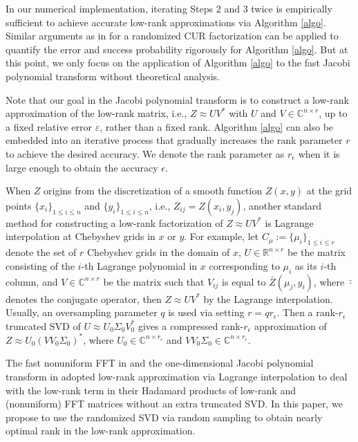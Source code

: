 \documentclass[11pt]{article}
\begin{document}
In our numerical implementation, iterating Steps $2$ and $3$ twice is empirically sufficient to achieve accurate low-rank approximations via Algorithm \ref{algo}. Similar arguments as in \cite{subCUR} for a randomized CUR factorization can be applied to quantify the error and success probability rigorously for Algorithm \ref{algo}. But at this point, we only focus on the application of Algorithm \ref{algo} to the fast Jacobi polynomial transform without theoretical analysis.



Note that our goal in the Jacobi polynomial transform is to construct a low-rank approximation of the low-rank matrix, i.e., $Z\approx U V^*$ with $U$ and $V\in\mathbb{C}^{n\times r}$, up to a fixed relative error $\varepsilon$, rather than a fixed rank. Algorithm \ref{algo} can also be embedded into an iterative process that gradually increases the rank parameter $r$ to achieve the desired accuracy. We denote the rank parameter as $r_\epsilon$ when it is large enough to obtain the accuracy $\epsilon$.



When $Z$ origins from the discretization of a smooth function $Z(x,y)$ at the grid points $\{x_i\}_{1\leq i\leq n}$ and $\{y_i\}_{1\leq i\leq n}$, i.e., $Z_{ij} = Z(x_i,y_j)$, another standard method for constructing a low-rank factorization of $Z\approx UV^*$ is Lagrange interpolation at Chebyshev grids in $x$ or $y$. For example, let $C_\mu:=\{\mu_i\}_{1\leq i\leq r}$ denote the set of $r$ Chebyshev grids in the domain of $x$, $U\in \mathbb{R}^{n\times r}$ be the matrix consisting of the $i$-th Lagrange polynomial in $x$ corresponding to $\mu_i$ as its $i$-th column, and $V\in\mathbb{C}^{n\times r}$ be the matrix such that $V_{ij}$ is equal to $\bar{Z}(\mu_j,y_i)$, where $\bar{\cdot}$ denotes the conjugate operator, then $Z\approx UV^*$ by the Lagrange interpolation. Usually, an oversampling parameter $q$ is used via setting $r=q r_\epsilon$. Then a rank-$r_\epsilon$ truncated SVD of $U\approx U_0 \Sigma_0 V_0^*$ gives a compressed rank-$r_\epsilon$ approximation of $Z\approx U_0 \left( V V_0 \Sigma_0\right)^*$, where $U_0\in\mathbb{C}^{n\times r_\epsilon}$ and $V V_0 \Sigma_0\in\mathbb{C}^{n\times r_\epsilon}$.



The fast nonuniform FFT in \cite{Townsend} and the one-dimensional Jacobi polynomial transform in \cite{Jacobi} adopted low-rank approximation via Lagrange interpolation to deal with the low-rank term in their Hadamard products of low-rank and (nonuniform) FFT matrices without an extra truncated SVD. In this paper, we propose to use the randomized SVD via random sampling to obtain nearly optimal rank in the low-rank approximation.
\end{document}
